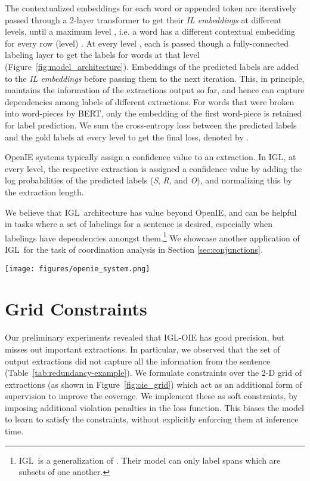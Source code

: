 \documentclass[11pt,a4paper]{article}
\newcommand{\shortname}{{\scshape IGL}}
\begin{document}
The contextualized embeddings for each word or appended token are iteratively passed through a 2-layer transformer to get their \textit{IL embeddings} at different levels, until a maximum level , i.e. a word  has a different contextual embedding  for every row (level) . At every level , each  is passed though a fully-connected labeling layer to get the labels for words at that level (Figure~\ref{fig:model_architecture}). Embeddings of the predicted labels are added to the \textit{IL embeddings} before passing them to the next iteration. This, in principle, maintains the information of the extractions output so far, and hence can capture dependencies among labels of different extractions.
For words that were broken into word-pieces by BERT, only the embedding of the first word-piece is retained for label prediction. We sum the  cross-entropy loss between the predicted labels and the gold labels at every level to get the final loss, denoted by .


OpenIE systems typically assign a confidence value to an extraction. In \shortname, at every level, the respective extraction is assigned a confidence value by adding the log probabilities of 
the predicted labels (\textit{S}, \textit{R}, and \textit{O}), and normalizing this by the extraction length.

We believe that \shortname\ architecture has value beyond OpenIE, and can be helpful in tasks where a set of labelings for a sentence is desired, especially when labelings have dependencies amongst them.\footnote{\shortname\ is a generalization of \citet{ju&a18}. Their model can only label spans which are subsets of one another.}  We showcase another application of \shortname~for the task of coordination analysis in Section \ref{sec:conjunctions}.

 
\begin{figure*}[htp]
\texttt{[image: figures/openie\_system.png]}
\hfill
\vspace*{-1ex}
\caption{The final OpenIE system. \shortname-CA identifies conjunct boundaries by labeling a 2-D grid. This generates simple sentences and C\shortname-OIE emits the final extractions.}
\label{fig:oie_system}
\end{figure*}

\section{Grid Constraints}
\label{sec:constraints}
Our preliminary experiments revealed that \shortname-OIE has good precision, but misses out important extractions. In particular, we observed that the set of output extractions did not capture all the information from the sentence (Table~\ref{tab:redundancy-example}). We formulate constraints over the 2-D grid of extractions (as shown in Figure~\ref{fig:oie_grid}) which act as an additional form of supervision to improve the coverage. We implement these as soft constraints, by imposing additional violation penalties in the loss function.
This biases the model to learn to satisfy the constraints, without explicitly enforcing them at inference time.
\end{document}
